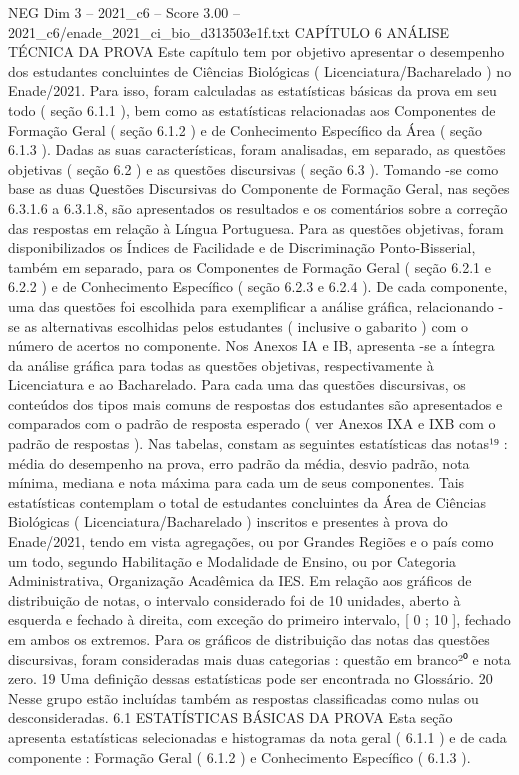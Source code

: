 \begin{textsample}{NEG Dim 3 – 2021\_c6 – Score 3.00 – 2021\_c6/enade\_2021\_ci\_bio\_d313503e1f.txt}  \label{ex:f3_neg_242}
CAPÍTULO 6 ANÁLISE TÉCNICA DA PROVA Este capítulo tem por objetivo apresentar o desempenho dos estudantes concluintes de Ciências Biológicas ( Licenciatura/Bacharelado ) no Enade/2021.
Para isso, foram calculadas as estatísticas básicas da prova em seu todo ( seção 6.1.1 ), bem como as estatísticas relacionadas aos Componentes de Formação Geral ( seção 6.1.2 ) e de Conhecimento Específico da Área ( seção 6.1.3 ).
Dadas as suas características, foram analisadas, em separado, as questões objetivas ( seção 6.2 ) e as questões discursivas ( seção 6.3 ).
Tomando -se como base as duas Questões Discursivas do Componente de Formação Geral, nas seções 6.3.1.6 a 6.3.1.8, são apresentados os resultados e os comentários sobre a correção das respostas em relação à Língua Portuguesa.
Para as questões objetivas, foram disponibilizados os Índices de Facilidade e de Discriminação Ponto-Bisserial, também em separado, para os Componentes de Formação Geral ( seção 6.2.1 e 6.2.2 ) e de Conhecimento Específico ( seção 6.2.3 e 6.2.4 ).
De cada componente, uma das questões foi escolhida para exemplificar a análise gráfica, relacionando -se as alternativas escolhidas pelos estudantes ( inclusive o gabarito ) com o número de acertos no componente.
Nos Anexos IA e IB, apresenta -se a íntegra da análise gráfica para todas as questões objetivas, respectivamente à Licenciatura e ao Bacharelado.
Para cada uma das questões discursivas, os conteúdos dos tipos mais comuns de respostas dos estudantes são apresentados e comparados com o padrão de resposta esperado ( ver Anexos IXA e IXB com o padrão de respostas ).
Nas tabelas, constam as seguintes estatísticas das notas¹⁹ : média do desempenho na prova, erro padrão da média, desvio padrão, nota mínima, mediana e nota máxima para cada um de seus componentes.
Tais estatísticas contemplam o total de estudantes concluintes da Área de Ciências Biológicas ( Licenciatura/Bacharelado ) inscritos e presentes à prova do Enade/2021, tendo em vista agregações, ou por Grandes Regiões e o país como um todo, segundo Habilitação e Modalidade de Ensino, ou por Categoria Administrativa, Organização Acadêmica da IES.
Em relação aos gráficos de distribuição de notas, o intervalo considerado foi de 10 unidades, aberto à esquerda e fechado à direita, com exceção do primeiro intervalo, [ 0 ; 10 ], fechado em ambos os extremos.
Para os gráficos de distribuição das notas das questões discursivas, foram consideradas mais duas categorias : questão em branco²⁰ e nota zero. 19 Uma definição dessas estatísticas pode ser encontrada no Glossário. 20 Nesse grupo estão incluídas também as respostas classificadas como nulas ou desconsideradas. 6.1 ESTATÍSTICAS BÁSICAS DA PROVA Esta seção apresenta estatísticas selecionadas e histogramas da nota geral ( 6.1.1 ) e de cada componente : Formação Geral ( 6.1.2 ) e Conhecimento Específico ( 6.1.3 ).

\end{textsample}
